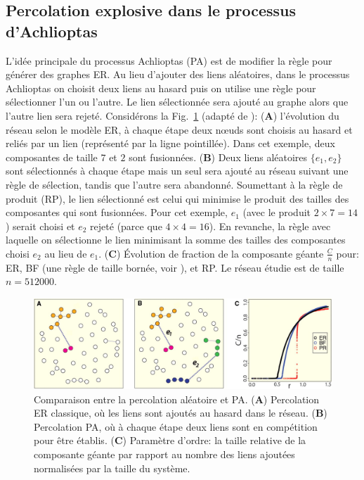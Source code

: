 \subsection{Percolation explosive dans le processus d'Achlioptas}

L'idée principale du processus Achlioptas (PA) \cite{Achlioptas-al2009} est de modifier la règle pour générer des graphes ER. Au lieu d'ajouter des liens aléatoires, dans le processus Achlioptas on choisit deux liens au hasard puis on utilise une règle pour sélectionner l'un ou l'autre. Le lien sélectionnée sera ajouté au graphe alors que l'autre lien sera rejeté. Considérons la Fig.~\ref{achlioptas} (adapté de \cite{Achlioptas-al2009}): (\textbf{A}) l'évolution du réseau  selon le modèle ER, à chaque étape deux nœuds sont choisis au hasard et reliés par un lien (représenté par la ligne pointillée). Dans cet exemple, deux composantes de taille $7$ et $2$ sont fusionnées. (\textbf{B}) Deux liens aléatoires $\{e_1,e_2\}$ sont sélectionnés à chaque étape mais un seul sera ajouté au réseau suivant une règle de sélection, tandis que l'autre sera abandonné.
Soumettant à la règle de produit (RP), le lien sélectionné est celui qui minimise le produit des tailles des composantes qui sont fusionnées. Pour cet exemple, $e_1$ (avec le produit $2\times7=14$) serait choisi et $e_2$ rejeté (parce que $4\times4=16$). En revanche, la règle avec laquelle on sélectionne le lien minimisant la somme des tailles des composantes choisi $e_2$ au lieu de $e_1$. (\textbf{C}) Évolution de fraction de la composante géante  $\frac{C}{n}$ pour: ER, BF (une règle de taille bornée, voir \cite{Bohman-Frieze2001}), et RP. Le réseau étudie est de taille $n=512000$.
\begin{figure}[h!]
	\centering
	\includegraphics[scale=0.35]{./figures/achlioptas3}
	\caption{Comparaison entre la percolation aléatoire et PA. (\textbf{A}) Percolation ER classique, où les liens sont ajoutés au hasard dans le réseau. (\textbf{B}) Percolation PA, où à chaque étape deux liens sont en compétition pour être établis. (\textbf{C}) Paramètre d'ordre: la taille relative de la composante géante par rapport au nombre des liens ajoutées normalisées par la taille du système.}
	\label{achlioptas}
\end{figure}

